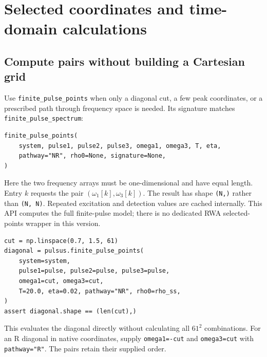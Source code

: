 \section{Selected coordinates and time-domain calculations}
\label{sec:coordinates}

\subsection{Compute pairs without building a Cartesian grid}

Use \texttt{finite\_pulse\_points} when only a diagonal cut, a few peak
coordinates, or a prescribed path through frequency space is needed. Its
signature matches \texttt{finite\_pulse\_spectrum}:
\par\noindent
\begin{minipage}{\linewidth}
\begin{lstlisting}[style=python]
finite_pulse_points(
    system, pulse1, pulse2, pulse3, omega1, omega3, T, eta,
    pathway="NR", rho0=None, signature=None,
)
\end{lstlisting}
\end{minipage}\par
Here the two frequency arrays must be one-dimensional and have equal
length. Entry $k$ requests the pair
$(\omega_1[k],\omega_3[k])$. The result has shape \texttt{(N,)} rather
than \texttt{(N, N)}. Repeated excitation and detection values are cached
internally. This API computes the full finite-pulse model; there is no
dedicated RWA selected-points wrapper in this version.

\par\noindent
\begin{minipage}{\linewidth}
\begin{lstlisting}[style=python]
cut = np.linspace(0.7, 1.5, 61)
diagonal = pulsus.finite_pulse_points(
    system=system,
    pulse1=pulse, pulse2=pulse, pulse3=pulse,
    omega1=cut, omega3=cut,
    T=20.0, eta=0.02, pathway="NR", rho0=rho_ss,
)
assert diagonal.shape == (len(cut),)
\end{lstlisting}
\end{minipage}\par
This evaluates the diagonal directly without calculating all
$61^2$ combinations. For an R diagonal in native coordinates, supply
\texttt{omega1=-cut} and \texttt{omega3=cut} with
\texttt{pathway="R"}. The pairs retain their supplied order.

